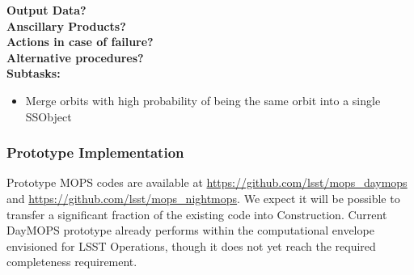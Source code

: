 \noindent
{\bf Output Data?}\\
{\bf Anscillary Products?}\\
{\bf Actions in case of failure?}\\
{\bf Alternative procedures?}\\

\noindent
{\bf Subtasks:}
\begin{itemize}
\item Merge orbits with high probability of being the same orbit into a single SSObject
\end{itemize}

\subsubsection{Prototype Implementation}

Prototype MOPS codes are available at
\url{https://github.com/lsst/mops_daymops} and
\url{https://github.com/lsst/mops_nightmops}. We expect it will be
possible to transfer a significant fraction of the existing code into
Construction. Current DayMOPS prototype already performs within the
computational envelope envisioned for LSST Operations, though it does
not yet reach the required completeness requirement.

